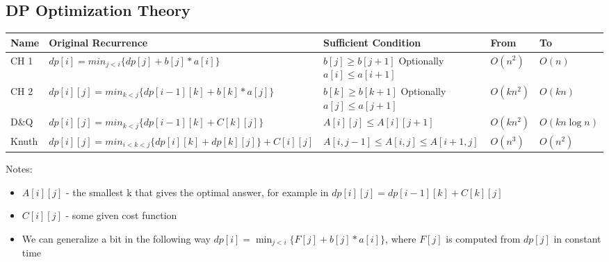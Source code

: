 \subsection{DP Optimization Theory}
\begin{tabular}{|p{0.8cm}| p{4.5cm}| p{3.3cm}|p{0.9cm}| p{1.3cm}|}
	\hline
	Name & Original Recurrence & Sufficient Condition & From  & To  \\ 
	\hline
	CH 1 & $dp[i] = min_{j<i}\{dp[j]+b[j]*a[i ]\}$ & $b[j] \geq b[j+1]$ Optionally $a[i] \leq a[i+1]$ & $O(n^2)$ & $O(n)$ \\ 
	\hline
	CH 2 & $dp[i][j] = min_{k<j}\{dp[i-1][k] + b[k] * a[j]\}$ & $b[k] \geq b[k+1]$ Optionally $a[j] \leq a[j+1]$ & $O(kn^2)$ & $O(kn)$ \\ 
	\hline
	D\&Q & $dp[i][j] = min_{k<j}\{dp[i-1][k] + C[k][j]\}$ & $A[i][j] \leq A[i][j+1]$ & $O(kn^2)$ & $O(kn\log n)$ \\ 
	\hline
	Knuth & $dp[i][j] = min_{i<k<j} \{dp[i][k] + dp[k][j] \} + C[i][j] $ & $A[i, j -1] \leq A[i, j] \leq A[i+1, j]$ & $O(n^3)$ & $O(n^2)$ \\ 
	\hline
\end{tabular} 
Notes:
\begin{itemize}
	\item $A[i][j]$ - the smallest k that gives the optimal answer, for example in $dp[i][j] = dp[i-1][k] + C[k][j]$
	\item $C[i][j]$ - some given cost function
	\item We can generalize a bit in the following way $dp[i] = \min_{j<i}\{F[j]+b[j] * a[i]\}$, where $F[j]$ is computed from $dp[j]$ in constant time
\end{itemize}

